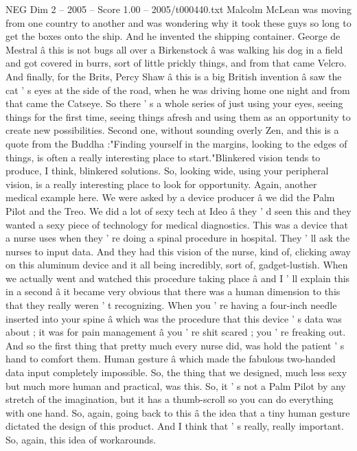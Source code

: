 \begin{textsample}{NEG Dim 2 – 2005 – Score 1.00 – 2005/t000440.txt}
Malcolm McLean was moving from one country to another and was wondering why it took these guys so long to get the boxes onto the ship.
And he invented the shipping container.
George de Mestral â this is not bugs all over a Birkenstock â was walking his dog in a field and got covered in burrs, sort of little prickly things, and from that came Velcro.
And finally, for the Brits, Percy Shaw â this is a big British invention â saw the cat ' s eyes at the side of the road, when he was driving home one night and from that came the Catseye.
So there ' s a whole series of just using your eyes, seeing things for the first time, seeing things afresh and using them as an opportunity to create new possibilities.
Second one, without sounding overly Zen, and this is a quote from the Buddha :"Finding yourself in the margins, looking to the edges of things, is often a really interesting place to start."Blinkered vision tends to produce, I think, blinkered solutions.
So, looking wide, using your peripheral vision, is a really interesting place to look for opportunity.
Again, another medical example here.
We were asked by a device producer â we did the Palm Pilot and the Treo.
We did a lot of sexy tech at Ideo â they ' d seen this and they wanted a sexy piece of technology for medical diagnostics.
This was a device that a nurse uses when they ' re doing a spinal procedure in hospital.
They ' ll ask the nurses to input data.
And they had this vision of the nurse, kind of, clicking away on this aluminum device and it all being incredibly, sort of, gadget-lustish.
When we actually went and watched this procedure taking place â and I ' ll explain this in a second â it became very obvious that there was a human dimension to this that they really weren ' t recognizing.
When you ' re having a four-inch needle inserted into your spine â which was the procedure that this device ' s data was about ; it was for pain management â you ' re shit scared ; you ' re freaking out.
And so the first thing that pretty much every nurse did, was hold the patient ' s hand to comfort them.
Human gesture â which made the fabulous two-handed data input completely impossible.
So, the thing that we designed, much less sexy but much more human and practical, was this.
So, it ' s not a Palm Pilot by any stretch of the imagination, but it has a thumb-scroll so you can do everything with one hand.
So, again, going back to this â the idea that a tiny human gesture dictated the design of this product.
And I think that ' s really, really important.
So, again, this idea of workarounds.

\end{textsample}
